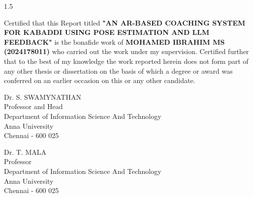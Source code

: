 \documentclass[12pt, a4paper]{report}
\begin{document}
\begin{spacing}{1.5} %
{\fontsize{13pt}{15.6pt}\selectfont
{} %
\sloppy %
Certified that this Report titled \textbf{"AN AR-BASED COACHING SYSTEM FOR KABADDI USING POSE ESTIMATION AND LLM FEEDBACK"} is the bonafide work of \textbf{MOHAMED IBRAHIM MS (2024178011)} who carried out the work under my supervision. Certified further that to the best of my knowledge the work reported herein does not form part of any other thesis or dissertation on the basis of which a degree or award was conferred on an earlier occasion on this or any other candidate.
\par}
\end{spacing}

\vspace{5cm}

\noindent
\begin{minipage}[t]{0.45\textwidth}
\flushleft
Dr. S. SWAMYNATHAN\\
Professor and Head\\
Department of Information Science And Technology\\
Anna University\\
Chennai - 600 025
\end{minipage}
\hfill
\begin{minipage}[t]{0.45\textwidth}
\flushleft
Dr. T. MALA\\
Professor\\
Department of Information Science And Technology\\
Anna University\\
Chennai - 600 025
\end{minipage}
\end{document}
